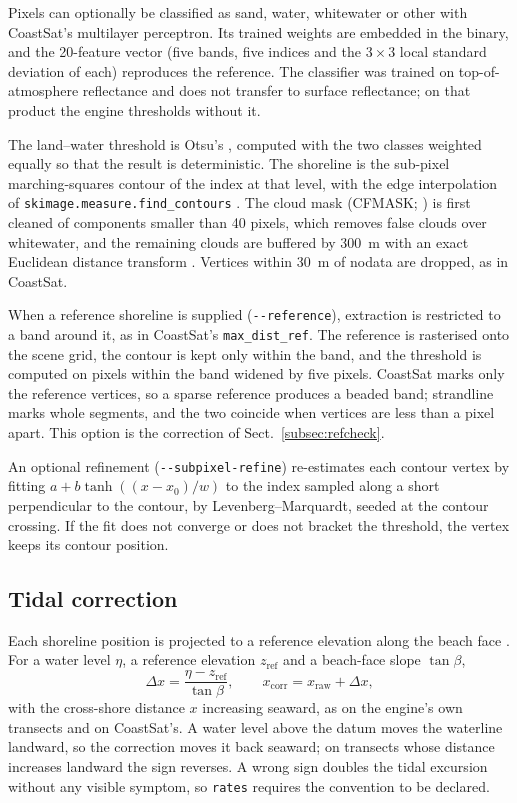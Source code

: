 \documentclass[authoryear,preprint,review,12pt]{elsarticle}
\begin{document}
Pixels can optionally be classified as sand, water, whitewater or other with
CoastSat's multilayer perceptron. Its trained weights are embedded in the
binary, and the 20-feature vector (five bands, five indices and the $3\times3$
local standard deviation of each) reproduces the reference. The classifier was
trained on top-of-atmosphere reflectance and does not transfer to surface
reflectance; on that product the engine thresholds without it.

The land--water threshold is Otsu's \citep{otsu1979}, computed with the two
classes weighted equally so that the result is deterministic. The shoreline is
the sub-pixel marching-squares contour of the index at that level, with the
edge interpolation of \texttt{skimage.measure.find\_contours}
\citep{vanderwalt2014skimage}. The cloud mask (CFMASK; \citealt{foga2017cfmask})
is first cleaned of components smaller than 40 pixels, which removes false
clouds over whitewater, and the remaining clouds are buffered by 300~m with an
exact Euclidean distance transform \citep{felzenszwalb2012edt}. Vertices within
30~m of nodata are dropped, as in CoastSat.

When a reference shoreline is supplied (\texttt{-{}-reference}), extraction is
restricted to a band around it, as in CoastSat's \texttt{max\_dist\_ref}. The
reference is rasterised onto the scene grid, the contour is kept only within
the band, and the threshold is computed on pixels within the band widened by
five pixels. CoastSat marks only the reference vertices, so a sparse reference
produces a beaded band; strandline marks whole segments, and the two coincide
when vertices are less than a pixel apart. This option is the correction of
Sect.~\ref{subsec:refcheck}.

An optional refinement (\texttt{-{}-subpixel-refine}) re-estimates each contour
vertex by fitting $a + b\tanh\left((x - x_0)/w\right)$ to the index sampled
along a short perpendicular to the contour, by Levenberg--Marquardt, seeded at
the contour crossing. If the fit does not converge or does not bracket the
threshold, the vertex keeps its contour position.

\subsection{Tidal correction}\label{subsec:tide}
Each shoreline position is projected to a reference elevation along the beach
face \citep{vos2019coastsat}. For a water level $\eta$, a reference elevation
$z_\mathrm{ref}$ and a beach-face slope $\tan\beta$,
\begin{equation}
  \Delta x = \frac{\eta - z_\mathrm{ref}}{\tan\beta},
  \qquad
  x_\mathrm{corr} = x_\mathrm{raw} + \Delta x ,
  \label{eq:tide}
\end{equation}
with the cross-shore distance $x$ increasing seaward, as on the engine's own
transects and on CoastSat's. A water level above the datum moves the waterline
landward, so the correction moves it back seaward; on transects whose distance
increases landward the sign reverses. A wrong sign doubles the tidal excursion
without any visible symptom, so \texttt{rates} requires the convention to be
declared.
\end{document}
